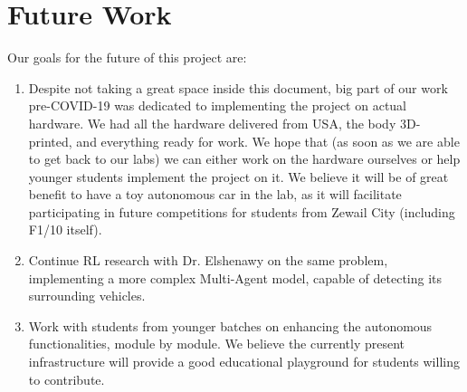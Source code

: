 \section{Future Work}
\label{sec:future_work}
Our goals for the future of this project are:
\begin{enumerate}
    \item Despite not taking a great space inside this document, big part of our work pre-COVID-19 was dedicated to implementing the project on actual hardware. We had all the hardware delivered from USA, the body 3D-printed, and everything ready for work. We hope that (as soon as we are able to get back to our labs) we can either work on the hardware ourselves or help younger students implement the project on it. We believe it will be of great benefit to have a toy autonomous car in the lab, as it will facilitate participating in future competitions for students from Zewail City (including F1/10 \cite{okelly2019f110} itself).
    
    \item Continue RL research with Dr. Elshenawy on the same problem, implementing a more complex Multi-Agent model, capable of detecting its surrounding vehicles.
    
    \item Work with students from younger batches on enhancing the autonomous functionalities, module by module. We believe the currently present infrastructure will provide a good educational playground for students willing to contribute.
\end{enumerate}
